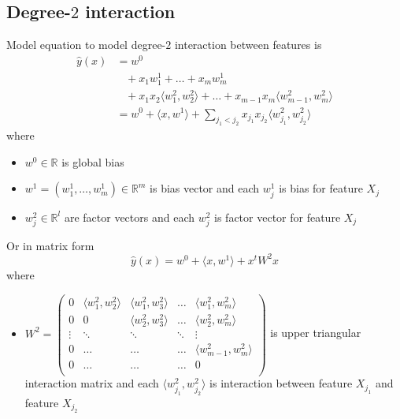 \documentclass[14pt, reqno]{amsart}
\theoremstyle{definition}
\begin{document}
\subsection{Degree-$2$ interaction} Model equation to model degree-$2$ interaction between features is
\begin{equation}\label{degree_2_model_equation}
\begin{split}
\hat{y}(x) & = w^0 \\
 & \,\,\,\,\, + x_1 w_1^1 + \dots + x_m w_m^1 \\
 & \,\,\,\,\, + x_1 x_2 \langle w_1^2, w_2^2 \rangle + \dots + x_{m-1} x_m \langle w_{m-1}^2, w_m^2 \rangle \\
 & = w^0 +  \langle x, w^1 \rangle + \sum\limits_{j_1 < j_2} x_{j_1} x_{j_2} \langle w_{j_1}^2, w_{j_2}^2 \rangle
\end{split}
\end{equation}
where
\begin{itemize}
\item $w^0 \in \mathbb{R}$ is global bias
\item $w^1 = (w_1^1, \dots, w_m^1) \in \mathbb{R}^m$ is bias vector and each $w_j^1$ is bias for feature $X_j$
\item $w_j^2 \in \mathbb{R}^l$ are factor vectors and each $w_j^2$ is factor vector for feature $X_j$
\end{itemize}

Or in matrix form
\begin{equation}\label{degree_2_model_equation_in_matrix_form}
\hat{y}(x) = w^0 + \langle x, w^1 \rangle + x^t W^2 x
\end{equation}
where
\begin{itemize}
\item $W^2 = \left( \begin{array}{ccccc}
0 & \langle w_1^2, w_2^2 \rangle & \langle w_1^2, w_3^2 \rangle & \dots & \langle w_1^2, w_m^2 \rangle \\
0 & 0 & \langle w_2^2, w_3^2 \rangle & \dots & \langle w_2^2, w_m^2 \rangle \\
\vdots & \ddots & \ddots & \ddots & \vdots \\
0 & \dots & \dots & \dots & \langle w_{m-1}^2, w_m^2 \rangle \\
0 & \dots & \dots & \dots & 0 \\
\end{array} \right)$ is upper triangular interaction matrix and each $\langle w_{j_1}^2, w_{j_2}^2 \rangle$ is interaction between feature $X_{j_1}$ and feature $X_{j_2}$
\end{itemize}
\end{document}
